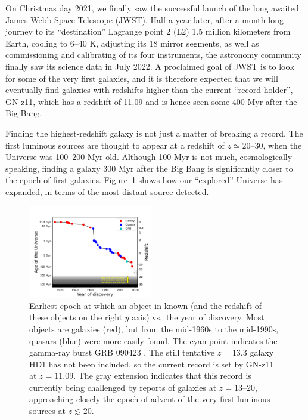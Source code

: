 \documentclass[useAMS,usenatbib,bibyear]{aa}
\begin{document}
On Christmas day 2021, we finally saw the successful launch of the long awaited James Webb Space Telescope (JWST).
Half a year later, after a month-long journey to its ``destination'' Lagrange point 2 (L2) 1.5 million kilometers from Earth, cooling to 6--40 K, adjusting its 18 mirror segments, as well as commissioning and calibrating of its four instruments, the astronomy community finally saw its science data in July 2022.
A proclaimed goal of JWST is to look for some of the very first galaxies, and it is therefore expected that we will eventually find galaxies with redshifts higher than the current ``record-holder'', GN-z11, which has a redshift of 11.09 \citep{Oesch2016} and is hence seen some 400 Myr after the Big Bang.

Finding the highest-redshift galaxy is not just a matter of breaking a record. The first luminous sources are thought to appear at a redshift of $z\simeq20\text{--}30$, when the Universe was 100--200 Myr old.
Although 100 Myr is not much, cosmologically speaking, finding a galaxy 300 Myr after the Big Bang is significantly closer to the epoch of first galaxies.
Figure~\ref{fig:zrecord} shows how our ``explored'' Universe has expanded, in terms of the most distant source detected.
\begin{figure}[!t]
    \centering
    \includegraphics [width=0.48\textwidth] {zrecord.pdf}
    \caption{Earliest epoch at which an object in known (and the redshift of these objects on the right $y$ axis) vs.~the year of discovery.
    Most objects are galaxies (red), but from the mid-1960s to the mid-1990s, quasars (blue) were more easily found. The cyan point indicates the gamma-ray burst GRB 090423 \citep{Tanvir2009}.
    The still tentative $z=13.3$ galaxy HD1 \citep{Harikane2022a} has not been included, so the current record is set by GN-z11 at $z=11.09$.
    The gray extension indicates that this record is currently being challenged by reports of galaxies at $z=13\text{--}20$, approaching closely the epoch of advent of the very first luminous sources at $z\lesssim20$.}
    \label{fig:zrecord}
\end{figure}
\end{document}
